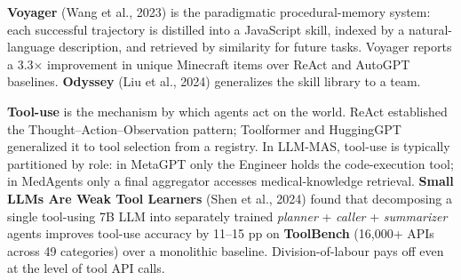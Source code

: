 \textbf{Voyager} (Wang et al., 2023) is the paradigmatic procedural-memory system: each successful trajectory is distilled into a JavaScript skill, indexed by a natural-language description, and retrieved by similarity for future tasks. Voyager reports a 3.3× improvement in unique Minecraft items over ReAct and AutoGPT baselines. \textbf{Odyssey} (Liu et al., 2024) generalizes the skill library to a team.

\textbf{Tool-use} is the mechanism by which agents act on the world. ReAct established the Thought--Action--Observation pattern; Toolformer and HuggingGPT generalized it to tool selection from a registry. In LLM-MAS, tool-use is typically partitioned by role: in MetaGPT only the Engineer holds the code-execution tool; in MedAgents only a final aggregator accesses medical-knowledge retrieval. \textbf{Small LLMs Are Weak Tool Learners} (Shen et al., 2024) found that decomposing a single tool-using 7B LLM into separately trained \emph{planner} + \emph{caller} + \emph{summarizer} agents improves tool-use accuracy by 11--15 pp on \textbf{ToolBench} (16,000+ APIs across 49 categories) over a monolithic baseline. Division-of-labour pays off even at the level of tool API calls.

